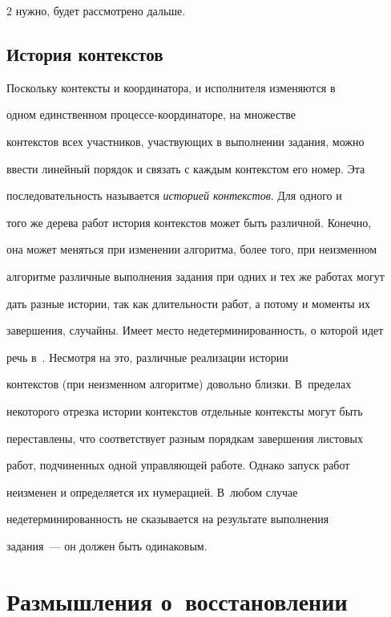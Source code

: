 \begin{multicols}{2}
нужно, будет рассмотрено дальше.





\subsection{История контекстов}


      


      Поскольку контексты и координатора, и исполнителя изменяются в 


одном единственном про\-цес\-се-ко\-ор\-ди\-на\-то\-ре, на множестве 


контекстов всех участников, участвующих в выполнении задания, можно 


ввести линейный порядок и связать с каж\-дым контекстом его номер. Эта 


последовательность называется \textit{историей контекстов}. Для одного и 


того же дерева работ история контекстов может быть различной. Конечно, 


она может меняться при изменении алгоритма, более того, при неизменном 


алгоритме различные выполнения задания при одних и тех же работах могут 


дать разные истории, так как длительности работ, а потому и моменты их 


завершения, случайны. Имеет место недетерминированность, о которой идет 


речь в~\cite{11-koz, 12-koz}. Несмотря на это, различные реализации истории 


контекстов (при неизменном алгоритме) довольно близки. В~пределах 


некоторого отрезка истории контекстов отдельные контексты могут быть 


переставлены, что соответствует разным порядкам завершения листовых 


работ, подчиненных одной управляющей работе. Однако запуск работ 


неизменен и определяется их нумерацией. В~любом случае 


недетерминированность не сказывается на результате выполнения 


      задания~--- он должен быть одинаковым.





\section{Размышления о~восстановлении}






\end{multicols}
